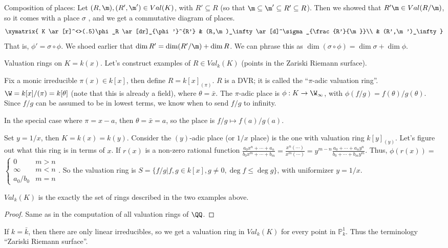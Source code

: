  Composition of places: Let $(R,\m),(R',\m')\in Val(K)$, with $R'\subseteq R$ (so that
 $\m\subseteq \m'\subseteq R'\subseteq R$). Then we showed that $R'\m\in Val(R/\m)$, so
 it comes with a place $\sigma$ \anton{}, and we get a commutative diagram of places.
 \[\xymatrix{
  K \ar[r]^<>(.5)\phi_R \ar[dr]_{\phi'}^{R'} & (R,\m)_\infty \ar[d]^\sigma_{\frac{R'}{\m}}\\
  & (R',\m')_\infty
 }\]
 That is, $\phi'=\sigma\circ \phi$. We shoed earlier that $\dim R'=\dim (R'/\m)+\dim R$.
 We can phrase this as $\dim (\sigma\circ \phi)=\dim \sigma + \dim \phi$.

 Valuation rings on $K=k(x)$. Let's construct examples of $R\in Val_k(K)$ (points in
 the Zariski Riemann surface).
 \begin{example}
   Fix a monic irreducible $\pi(x)\in k[x]$, then define $R=k[x]_{(\pi)}$. $R$ is a DVR;
   it is called the ``$\pi$-adic valuation ring''. $\W =
   k[x]/(\pi) = k[\theta]$ (note that this is already a field), where $\theta = \bar x$.
   The $\pi$-adic place is $\phi:K\to \W_\infty$, with $\phi(f/g) = f(\theta)/g(\theta)$.
   Since $f/g$ can be assumed to be in lowest terms, we know when to send $f/g$ to
   infinity.

   In the special case where $\pi = x-a$, then $\theta = \bar x = a$, so the place is
   $f/g\mapsto f(a)/g(a)$.
 \end{example}
 \begin{example}
   Set $y = 1/x$, then $K=k(x)=k(y)$. Consider the $(y)$-adic place (or $1/x$ place) is
   the one with valuation ring $k[y]_(y)$. Let's figure out what this ring is in terms of
   $x$. If $r(x)$ is a non-zero rational function $\frac{a_0 x^n+\cdots+ a_n}{b_0x^m +\cdots
   +b_m} = \frac{x^n(\cdots)}{x^m(\cdots)} = y^{m-n} \frac{a_0+\cdots+ a_n y^n}{b_0 +\cdots
   +b_m y^m}$. Thus, $\phi(r(x)) =${\scriptsize $\begin{cases}
     0 & m> n\\
     \infty & m<n\\
     a_0/b_0 & m=n
   \end{cases}$}. So the valuation ring is $S=\{f/g|f,g\in k[x], g\neq 0, \deg f\le \deg
   g\}$, with uniformizer $y=1/x$.
 \end{example}
 \begin{theorem}
   $Val_k(K)$ is the exactly the set of rings described in the two examples above.
 \end{theorem}
 \begin{proof}
   Same as in the computation of all valuation rings of $\QQ$.
 \end{proof}
 If $k=\bar k$, then there are only linear irreducibles, so we get a valuation ring in
 $Val_k(K)$ for every point in $\mathbb{P}^1_k$. Thus the terminology ``Zariski Riemann
 surface''.

